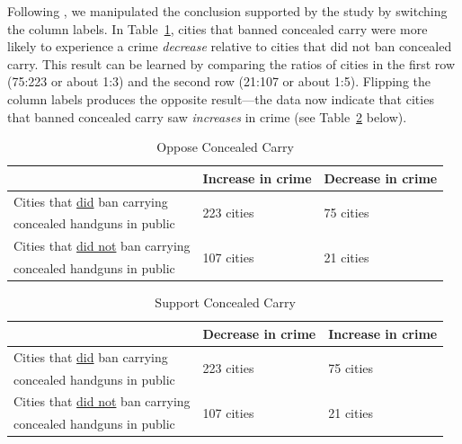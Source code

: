 \documentclass[12pt, letterpaper]{article}
\begin{document}
Following \citet{kahan2017}, we manipulated the conclusion supported by the study by switching the column labels. In Table~\ref{tab:antigun}, cities that banned concealed carry were more likely to experience a crime {\it decrease} relative to cities that did not ban concealed carry. This result can be learned by comparing the ratios of cities in the first row (75:223 or about 1:3) and the second row (21:107 or about 1:5). Flipping the column labels produces the opposite result---the data now indicate that cities that banned concealed carry saw {\it increases} in crime (see Table~\ref{tab:progun} below).

\singlespacing
\begin{table}[h]
\centering
\caption {Oppose Concealed Carry} \label{tab:antigun}
\begin{tabular}{|l|l|l|}
\hline 
  & Increase in crime  & Decrease in crime \\\hline
  Cities that \underline{did} ban carrying     & \multirow{2}{*}{223 cities} & \multirow{2}{*}{75 cities} \\ 
  concealed handguns in public           &               & \\ \hline
  Cities that \underline{did not} ban carrying & \multirow{2}{*}{107 cities} & \multirow{2}{*}{21 cities} \\ 
  concealed handguns in public           &               &  \\\hline
\end{tabular}
\end{table}

\begin{table}[h]
\centering
\caption {Support Concealed Carry} \label{tab:progun}
\begin{tabular}{|l|l|l|}
\hline 
  & Decrease in crime & Increase in crime \\\hline
  Cities that \underline{did} ban carrying     & \multirow{2}{*}{223 cities} & \multirow{2}{*}{75 cities} \\ 
  concealed handguns in public           &               & \\ \hline
  Cities that \underline{did not} ban carrying & \multirow{2}{*}{107 cities} & \multirow{2}{*}{21 cities} \\ 
  concealed handguns in public           &               &  \\\hline
\end{tabular}
\end{table}
\doublespacing
\vspace{5mm}
\end{document}
